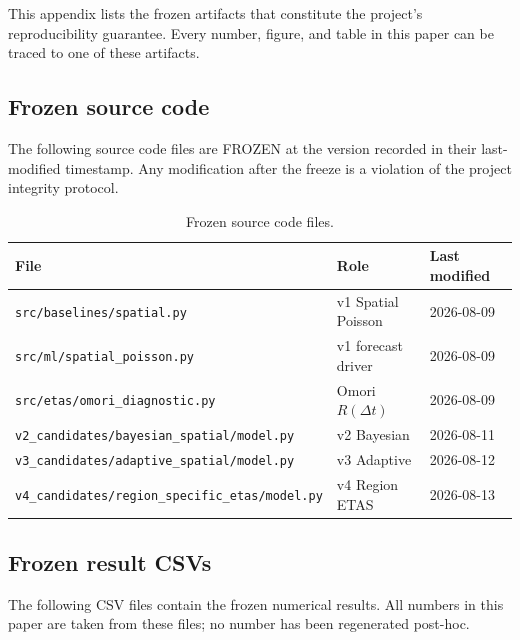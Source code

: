 \documentclass[10pt,a4paper,twocolumn]{article}
\begin{document}
This appendix lists the frozen artifacts that constitute the project's reproducibility guarantee. Every number, figure, and table in this paper can be traced to one of these artifacts.

\subsection{Frozen source code}

The following source code files are FROZEN at the version recorded in their last-modified timestamp. Any modification after the freeze is a violation of the project integrity protocol.

\begin{table}[t]
\centering
\caption{Frozen source code files.}\label{tab:frozen-code}
\small
\begin{tabular*}{\columnwidth}{@{\extracolsep{\fill}}lll}
\toprule
File & Role & Last modified \\
\midrule
\texttt{src/baselines/spatial.py} & v1 Spatial Poisson & 2026-08-09 \\
\texttt{src/ml/spatial\_poisson.py} & v1 forecast driver & 2026-08-09 \\
\texttt{src/etas/omori\_diagnostic.py} & Omori $R(\Delta t)$ & 2026-08-09 \\
\texttt{v2\_candidates/bayesian\_spatial/model.py} & v2 Bayesian & 2026-08-11 \\
\texttt{v3\_candidates/adaptive\_spatial/model.py} & v3 Adaptive & 2026-08-12 \\
\texttt{v4\_candidates/region\_specific\_etas/model.py} & v4 Region ETAS & 2026-08-13 \\
\bottomrule
\end{tabular*}
\end{table}

\subsection{Frozen result CSVs}

The following CSV files contain the frozen numerical results. All numbers in this paper are taken from these files; no number has been regenerated post-hoc.
\end{document}
